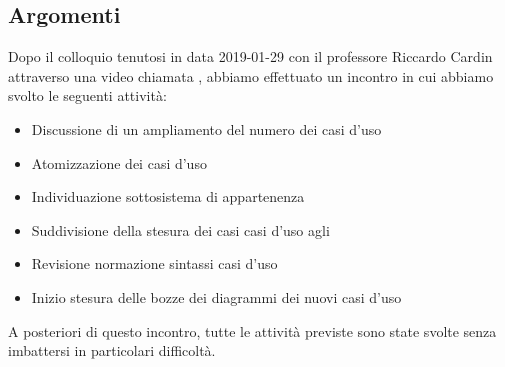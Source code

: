         \subsection{Argomenti}
            Dopo il colloquio tenutosi in data 2019-01-29 con il professore Riccardo Cardin attraverso una video chiamata , abbiamo effettuato un incontro in cui abbiamo svolto le seguenti attività:
            \begin{itemize}
                \item Discussione di un ampliamento del numero dei casi d'uso
                \item Atomizzazione dei casi d'uso
                \item Individuazione sottosistema di appartenenza
                \item Suddivisione della stesura dei casi casi d'uso agli \Anas 
                \item Revisione normazione sintassi casi d'uso
                \item Inizio stesura delle bozze dei diagrammi dei nuovi casi d'uso 
            \end{itemize}
            A posteriori di questo incontro, tutte le attività previste sono state svolte senza imbattersi in
            particolari difficoltà.

